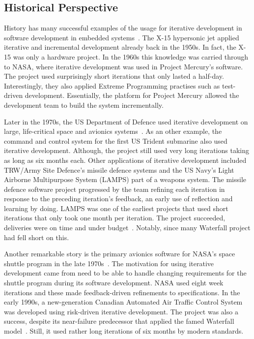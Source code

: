 \documentclass[english]{tktltiki2}
\begin{document}
\subsection{Historical Perspective}

History has many successful examples of the usage for iterative development in software development in embedded systems~\cite{LB03}. The X-15 hypersonic jet applied iterative and incremental development already back in the 1950s. In fact, the X-15 was only a hardware project. In the 1960s this knowledge was carried through to NASA, where iterative development was used in Project Mercury’s software. The project used surprisingly short iterations that only lasted a half-day. Interestingly, they also applied Extreme Programming practises such as test-driven development. Essentially, the platform for Project Mercury allowed the development team to build the system incrementally.

Later in the 1970s, the US Department of Defence used iterative development on large, life-critical space and avionics systems~\cite{LB03}. As an other example, the command and control system for the first US Trident submarine also used iterative development. Although, the project still used very long iterations taking as long as six months each. Other applications of iterative development included TRW/Army Site Defence’s missile defence systems and the US Navy’s Light Airborne Multipurpose System (LAMPS) part of a weapons system. The missile defence software project progressed by the team refining each iteration in response to the preceding iteration’s feedback, an early use of reflection and learning by doing. LAMPS was one of the earliest projects that used short iterations that only took one month per iteration. The project succeeded, deliveries were on time and under budget~\cite{LB03}. Notably, since many Waterfall project had fell short on this.

Another remarkable story is the primary avionics software for NASA’s space shuttle program in the late 1970s~\cite{LB03}. The motivation for using iterative development came from need to be able to handle changing requirements for the shuttle program during its software development. NASA used eight week iterations and these made feedback-driven refinements to specifications. In the early 1990s, a new-generation Canadian Automated Air Traffic Control System was developed using risk-driven iterative development. The project was also a success, despite its near-failure predecessor that applied the famed Waterfall model~\cite{LB03}. Still, it used rather long iterations of six months by modern standards.
\end{document}
